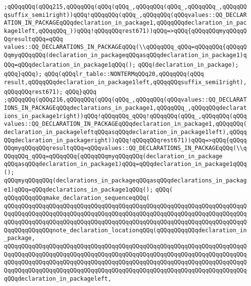 \verb|;qQQqqQQq(qQQq215,qQQqqQQq(qQQq(qQQq_,qQQqqQQq(qQQq_,qQQqqQQq_,qQQqqQQqsuffix_semi1right))qQQq!qQQqqQQq(qQQq_,qQQqqQQq(qQQqvalues::QQ_DECLARATION_IN_PACKAGEqQQqdeclaration_in_package1,qQQqqQQqdeclaration_in_package1left,qQQqqQQq_))qQQq!qQQqqQQqrest671))qQQq=>qQQq{qQQqqQQqmyqQQqqQQqresultqQQq=qQQq|\newline
\verb|values::QQ_DECLARATIONS_IN_PACKAGEqQQq(\\qQQqqQQq_qQQq=qQQqqQQq{qQQqqQQqmyqQQqqQQq(declaration_in_packageqQQqasqQQqdeclaration_in_package1)qQQq=qQQqdeclaration_in_package1qQQq();|\newline
\verb|qQQq(declaration_in_package);|\newline
\verb|qQQq}qQQq);|\newline
\verb|qQQq(qQQqlr_table::NONTERMqQQq20,qQQqqQQq(qQQq|\newline
\verb|result,qQQqqQQqdeclaration_in_package1left,qQQqqQQqsuffix_semi1right),qQQqqQQqrest671);|\newline
\verb|qQQq}qQQq|\newline
\verb|;qQQqqQQq(qQQq216,qQQqqQQq(qQQq(qQQq_,qQQqqQQq(qQQqvalues::QQ_DECLARATIONS_IN_PACKAGEqQQqdeclarations_in_package1,qQQqqQQq_,qQQqqQQqdeclarations_in_package1right))qQQq!qQQqqQQq_qQQq!qQQqqQQq(qQQq_,qQQqqQQq(qQQqvalues::QQ_DECLARATION_IN_PACKAGEqQQqdeclaration_in_package1,qQQqqQQq(|\newline
\verb|declaration_in_packageleftqQQqasqQQqdeclaration_in_package1left),qQQqqQQqdeclaration_in_packageright))qQQq!qQQqqQQqrest671))qQQq=>qQQq{qQQqqQQqmyqQQqqQQqresultqQQq=qQQqvalues::QQ_DECLARATIONS_IN_PACKAGEqQQq(\\qQQqqQQq_qQQq=qQQqqQQq{qQQqqQQqmyqQQqqQQq(declaration_in_package|\newline
\verb|qQQqasqQQqdeclaration_in_package1)qQQq=qQQqdeclaration_in_package1qQQq();|\newline
\verb|qQQqmyqQQqqQQq(declarations_in_packageqQQqasqQQqdeclarations_in_package1)qQQq=qQQqdeclarations_in_package1qQQq();|\newline
\verb|qQQq(|\newline
\verb|qQQqqQQqqQQqmake_declaration_sequenceqQQq(|\newline
\verb|qQQqqQQqqQQqqQQqqQQqqQQqqQQqqQQqqQQqqQQqqQQqqQQqqQQqqQQqqQQqqQQqqQQqqQQqqQQqqQQqqQQqqQQqqQQqqQQqqQQqqQQqqQQqqQQqqQQqqQQqqQQqqQQqqQQqqQQqqQQqqQQqqQQqqQQqqQQqqQQqqQQqqQQqqQQqqQQqqQQqqQQqqQQqqQQqqQQqqQQqqQQqqQQqqQQqqQQqqQQqqQQqnote_declaration_locationqQQq(qQQqqQQqqQQqdeclaration_in_package,|\newline
\verb|qQQqqQQqqQQqqQQqqQQqqQQqqQQqqQQqqQQqqQQqqQQqqQQqqQQqqQQqqQQqqQQqqQQqqQQqqQQqqQQqqQQqqQQqqQQqqQQqqQQqqQQqqQQqqQQqqQQqqQQqqQQqqQQqqQQqqQQqqQQqqQQqqQQqqQQqqQQqqQQqqQQqqQQqqQQqqQQqqQQqqQQqqQQqqQQqqQQqqQQqqQQqqQQqqQQqqQQqqQQqqQQqqQQqqQQqqQQqqQQqqQQqqQQqqQQqqQQqqQQqqQQqqQQqqQQqqQQqqQQqqQQqdeclaration_in_packageleft,|\newline
